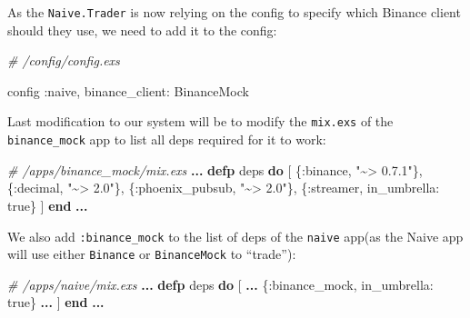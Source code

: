 \documentclass[
]{book}
\newenvironment{Shaded}{\begin{snugshade}}{\end{snugshade}}
\newcommand{\CommentTok}[1]{\textcolor[rgb]{0.56,0.35,0.01}{\textit{#1}}}
\newcommand{\ConstantTok}[1]{\textcolor[rgb]{0.00,0.00,0.00}{#1}}
\newcommand{\KeywordTok}[1]{\textcolor[rgb]{0.13,0.29,0.53}{\textbf{#1}}}
\newcommand{\NormalTok}[1]{#1}
\newcommand{\OperatorTok}[1]{\textcolor[rgb]{0.81,0.36,0.00}{\textbf{#1}}}
\newcommand{\StringTok}[1]{\textcolor[rgb]{0.31,0.60,0.02}{#1}}
\newcommand{\VariableTok}[1]{\textcolor[rgb]{0.00,0.00,0.00}{#1}}
\begin{document}
As the \texttt{Naive.Trader} is now relying on the config to specify which Binance client should they use, we need to add it to the config:

\begin{Shaded}
\begin{Highlighting}[]
\CommentTok{\# /config/config.exs}

\NormalTok{config }\VariableTok{:naive}\NormalTok{,}
  \VariableTok{binance\_client:} \ConstantTok{BinanceMock}
\end{Highlighting}
\end{Shaded}

Last modification to our system will be to modify the \texttt{mix.exs} of the \texttt{binance\_mock} app to list all deps required for it to work:

\begin{Shaded}
\begin{Highlighting}[]
\CommentTok{\# /apps/binance\_mock/mix.exs}
\OperatorTok{...}
  \KeywordTok{defp}\NormalTok{ deps }\KeywordTok{do}
\NormalTok{    [}
\NormalTok{      \{}\VariableTok{:binance}\NormalTok{, }\StringTok{"\textasciitilde{}\textgreater{} 0.7.1"}\NormalTok{\},}
\NormalTok{      \{}\VariableTok{:decimal}\NormalTok{, }\StringTok{"\textasciitilde{}\textgreater{} 2.0"}\NormalTok{\},}
\NormalTok{      \{}\VariableTok{:phoenix\_pubsub}\NormalTok{, }\StringTok{"\textasciitilde{}\textgreater{} 2.0"}\NormalTok{\},}
\NormalTok{      \{}\VariableTok{:streamer}\NormalTok{, }\VariableTok{in\_umbrella:} \ConstantTok{true}\NormalTok{\}}
\NormalTok{    ]}
  \KeywordTok{end}
\OperatorTok{...}
\end{Highlighting}
\end{Shaded}

We also add \texttt{:binance\_mock} to the list of deps of the \texttt{naive} app(as the Naive app will use either \texttt{Binance} or \texttt{BinanceMock} to ``trade''):

\begin{Shaded}
\begin{Highlighting}[]
\CommentTok{\# /apps/naive/mix.exs}
\OperatorTok{...}
  \KeywordTok{defp}\NormalTok{ deps }\KeywordTok{do}
\NormalTok{    [}
      \OperatorTok{...}
\NormalTok{      \{}\VariableTok{:binance\_mock}\NormalTok{, }\VariableTok{in\_umbrella:} \ConstantTok{true}\NormalTok{\}}
      \OperatorTok{...}
\NormalTok{    ]}
  \KeywordTok{end}
\OperatorTok{...}
\end{Highlighting}
\end{Shaded}
\end{document}
